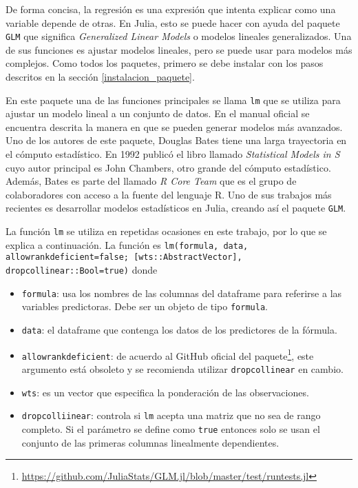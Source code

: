 De forma concisa, la regresión es una expresión que intenta explicar como una variable depende de otras. En \textsf{Julia}, esto se puede hacer con ayuda del paquete \texttt{GLM} \citep{software_glm} que significa \textit{Generalized Linear Models} o modelos lineales generalizados. Una de sus funciones es ajustar modelos lineales, pero se puede usar para modelos más complejos. Como todos los paquetes, primero se debe instalar con los pasos descritos en la sección \ref{instalacion_paquete}. 

En este paquete una de las funciones principales se llama \texttt{lm} que se utiliza para ajustar un modelo lineal a un conjunto de datos. En el manual oficial \cite{glm_manual} se encuentra descrita la manera en que se pueden generar modelos más avanzados. Uno de los autores de este paquete, Douglas Bates tiene una larga trayectoria en el cómputo estadístico. En 1992 publicó el libro llamado \textit{Statistical Models in S} cuyo autor principal es John Chambers, otro grande del cómputo estadístico. Además, Bates es parte del llamado \textit{R Core Team} que es el grupo de colaboradores con acceso a la fuente del lenguaje \textsf{R}. Uno de sus trabajos más recientes es desarrollar modelos estadísticos en \textsf{Julia}, creando así el paquete \texttt{GLM}. 

La función \texttt{lm} se utiliza en repetidas ocasiones en este trabajo, por lo que se explica a continuación. La función es \texttt{lm(formula, data, allowrankdeficient=false; [wts::AbstractVector], dropcollinear::Bool=true)} donde 

\begin{itemize}
    \item \texttt{formula}: usa los nombres de las columnas del dataframe para referirse a las variables predictoras. Debe ser un objeto de tipo \texttt{formula}. 
    
    \item \texttt{data}: el dataframe que contenga los datos de los predictores de la fórmula.
    
    \item \texttt{allowrankdeficient}: de acuerdo al GitHub oficial del paquete\footnote{\url{https://github.com/JuliaStats/GLM.jl/blob/master/test/runtests.jl}}, este argumento está obsoleto y se recomienda utilizar \texttt{dropcollinear} en cambio. 
    
    \item \texttt{wts}: es un vector que especifica la ponderación de las observaciones. 
    
    \item \texttt{dropcolliinear}: controla si \texttt{lm} acepta una matriz que no sea de rango completo. Si el parámetro se define como \texttt{true} entonces solo se usan el conjunto de las primeras columnas linealmente dependientes.
\end{itemize}



